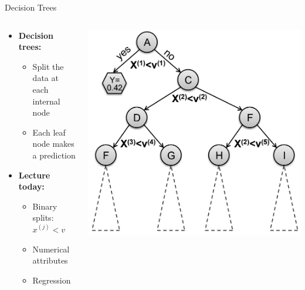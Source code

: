 \begin{frame}{Decision Trees}
    \begin{columns}
        \begin{column}{0.5\textwidth}
            \begin{itemize}
                \item \textbf{Decision trees:}
                \begin{itemize}
                    \item Split the data at each internal node
                    \item Each leaf node makes a prediction
                \end{itemize}
                \item \textbf{Lecture today:}
                \begin{itemize}
                    \item Binary splits: $x^{(j)} < v$
                    \item Numerical attributes
                    \item Regression
                \end{itemize}
            \end{itemize}
        \end{column}
        \begin{column}{0.5\textwidth}
            \includegraphics[width=\linewidth]{images/decision-trees/decision-trees-4.png}
        \end{column}
    \end{columns}
\end{frame}



